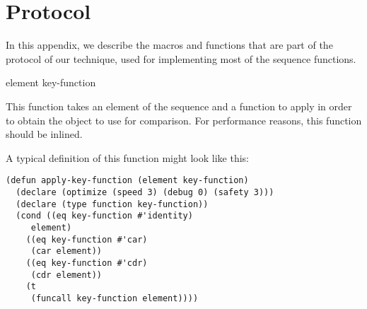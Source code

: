 \appendix

\section{Protocol}

In this appendix, we describe the macros and functions that are part
of the protocol of our technique, used for implementing most of the
sequence functions.

 {element key-function}

This function takes an element of the sequence and a function to apply
in order to obtain the object to use for comparison.  For performance
reasons, this function should be inlined.

A typical definition of this function might look like this:

{\small\begin{verbatim}
(defun apply-key-function (element key-function)
  (declare (optimize (speed 3) (debug 0) (safety 3)))
  (declare (type function key-function))
  (cond ((eq key-function #'identity)
	 element)
	((eq key-function #'car)
	 (car element))
	((eq key-function #'cdr)
	 (cdr element))
	(t
	 (funcall key-function element))))
\end{verbatim}}
